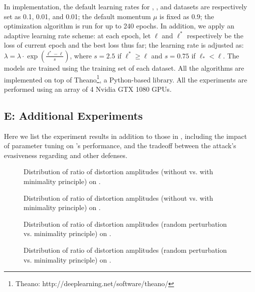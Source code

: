 In implementation, the default learning rates for \mnist, \cifar, and \svhn datasets are respectively set as 0.1, 0.01, and 0.01; the default momentum $\mu$ is fixed as 0.9; the optimization algorithm is run for up to 240 epochs. In addition, we apply an adaptive learning rate scheme: at each epoch, let $\ell$ and $\ell^*$ respectively be the loss of current epoch and the best loss thus far; the learning rate is adjusted as: $\lambda = \lambda \cdot \exp (\frac{\ell^* - \ell}{s})$, where $s = 2.5$ if $\ell^* \geq \ell$ and $s = 0.75$ if  $\ell_* < \ell$. The \dnn models are trained using the training set of each dataset.
 All the algorithms are implemented on top of Theano\footnote{Theano: http://deeplearning.net/software/theano/}, a Python-based \dl library. All the experiments are performed using an array of 4 Nvidia GTX 1080 GPUs.

\subsection*{E: Additional Experiments}

Here we list the experiment results in addition to those in , including the impact of parameter tuning on \system's performance, and the tradeoff between the attack's evasiveness regarding \system and other defenses.

\begin{figure}
\caption{Distribution of ratio of distortion amplitudes (without vs. with minimality principle) on \cifar. \label{fig:pratiocifar}}
\end{figure}


\begin{figure}
\caption{Distribution of ratio of distortion amplitudes (without vs. with minimality principle) on \mnist. \label{fig:pratiomnist}}
\end{figure}


\begin{figure}
\caption{Distribution of ratio of distortion amplitudes (random perturbation vs. minimality principle) on \cifar. \label{fig:pratiocifar2}}
\end{figure}


\begin{figure}
\caption{Distribution of ratio of distortion amplitudes (random perturbation vs. minimality principle)  on \mnist. \label{fig:pratiomnist2}}
\end{figure}





